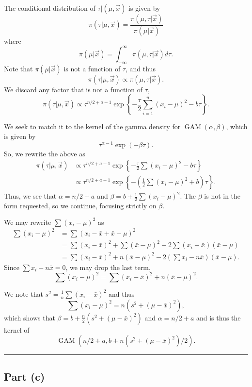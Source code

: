 \documentclass[
  11pt,
]{paper}
\begin{document}
The conditional distribution of \(\tau|(\mu,\vec{x})\) is given by \[
  \pi(\tau | \mu,\vec{x}) = \frac{\pi(\mu,\tau|\vec{x})}{\pi(\mu|\vec{x})}
\] where \[
  \pi(\mu|\vec{x}) = \int_{-\infty}^{\infty} \pi(\mu,\tau|\vec{x}) d\tau.
\] Note that \(\pi(\mu|\vec{x})\) is not a function of \(\tau\), and
thus \[
  \pi(\tau | \mu,\vec{x}) \propto \pi(\mu,\tau|\vec{x}).
\] We discard any factor that is not a function of \(\tau\), \[
  \pi(\tau | \mu,\vec{x}) \propto \tau^{n/2+a-1} \exp\left\{-\frac{\tau}{2}\sum_{i=1}^{n}(x_i-\mu)^2 - b \tau \right\}.
\]

We seek to match it to the kernel of the gamma density for
\(\operatorname{GAM}(\alpha,\beta)\), which is given by \[
  \tau^{\alpha-1}\exp(-\beta \tau).
\] So, we rewrite the above as \begin{align}
  \pi(\tau | \mu,\vec{x})
    &\propto \tau^{n/2+a-1} \exp\left\{-\frac{\tau}{2}\sum(x_i-\mu)^2 - b \tau \right\}\\
    &\propto \tau^{n/2+a-1} \exp\left\{-\left(\frac{1}{2}\sum(x_i-\mu)^2 + b\right) \tau \right\}.
\end{align} Thus, we see that \(\alpha = n/2+a\) and
\(\beta = b + \frac{1}{2}\sum(x_i-\mu)^2\). The \(\beta\) is not in the
form requested, so we continue, focusing strictly on \(\beta\).

We may rewrite \(\sum(x_i-\mu)^2\) as \begin{align}
  \sum(x_i-\mu)^2 &= \sum(x_i- \bar{x} + \bar{x} - \mu)^2\\
                  &= \sum(x_i- \bar{x})^2 + \sum(\bar{x} - \mu)^2 - 2 \sum(x_i - \bar{x})(\bar{x} - \mu)\\
                  &= \sum(x_i- \bar{x})^2 + n(\bar{x} - \mu)^2 - 2 \left(\sum x_i  - n \bar{x}\right)(\bar{x} - \mu).
\end{align} Since \(\sum x_i - n \bar{x} = 0\), we may drop the last
term, \[
  \sum(x_i-\mu)^2 = \sum(x_i- \bar{x})^2 + n(\bar{x} - \mu)^2.
\]

We note that \(s^2 = \frac{1}{n}\sum(x_i - \bar{x})^2\) and thus \[
  \sum(x_i-\mu)^2 = n(s^2 + (\mu-\bar{x})^2),
\] which shows that \(\beta = b + \frac{n}{2}(s^2 + (\mu-\bar{x})^2)\)
and \(\alpha = n/2+a\) and is thus the kernel of \[
  \operatorname{GAM}\!\left(n/2+a,b + n(s^2 + (\mu-\bar{x})^2)/2\right).
\]

\begin{center}\rule{0.5\linewidth}{0.5pt}\end{center}

\hypertarget{part-c-2}{%
\subsection{Part (c)}\label{part-c-2}}
\end{document}
